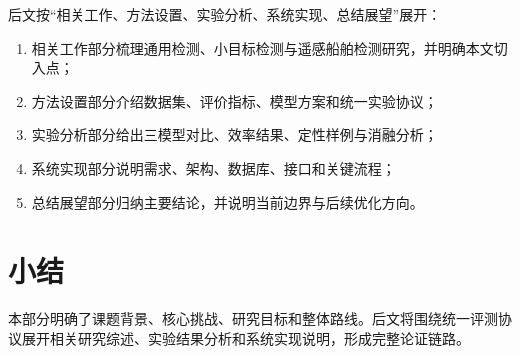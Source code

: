 后文按“相关工作、方法设置、实验分析、系统实现、总结展望”展开：

\begin{enumerate}
  \item 相关工作部分梳理通用检测、小目标检测与遥感船舶检测研究，并明确本文切入点；
  \item 方法设置部分介绍数据集、评价指标、模型方案和统一实验协议；
  \item 实验分析部分给出三模型对比、效率结果、定性样例与消融分析；
  \item 系统实现部分说明需求、架构、数据库、接口和关键流程；
  \item 总结展望部分归纳主要结论，并说明当前边界与后续优化方向。
\end{enumerate}

\section{小结}

本部分明确了课题背景、核心挑战、研究目标和整体路线。后文将围绕统一评测协议展开相关研究综述、实验结果分析和系统实现说明，形成完整论证链路。
